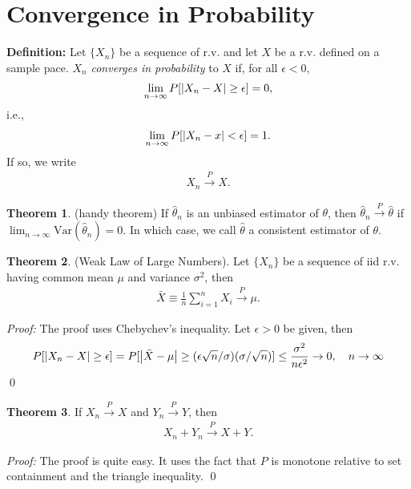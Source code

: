\documentclass{book}
\theoremstyle{definition}
\newtheorem{thm}{Theorem}[section]
\newcommand{\f}[2]{\frac{#1}{#2}}
\begin{document}
 




\section{Convergence in Probability}


\noindent \textbf{Definition:} Let $\{X_n\}$ be a sequence of r.v. and let $X$ be  a r.v. defined on a sample pace. $X_n$ \textit{converges in probability} to $X$ if, for all $\epsilon < 0$,
\begin{align}
\lim_{n\to \infty}P[\abs{X_n - X} \geq \epsilon] = 0,
\end{align}
i.e.,
\begin{align}
\lim_{n\to \infty}P[\abs{X_n - x} < \epsilon] = 1.
\end{align}
If so, we write
\begin{align}
X_n \xrightarrow{P} X.
\end{align}





\begin{thm} (handy theorem) If $\hat\theta_n$ is an unbiased estimator of $\theta$, then $\hat\theta_n \xrightarrow{P} \hat\theta$ if $\lim_{n\to \infty} \text{Var}{(\hat\theta_n)} = 0$. In which case, we call $\hat\theta$ a consistent estimator of $\theta$.\\
\end{thm}



\begin{thm} (Weak Law of Large Numbers). Let $\{ X_n\}$ be a sequence of iid r.v. having common mean $\mu$ and variance $\sigma^2$, then
\begin{align}
\bar{X} \equiv \f{1}{n}\sum^n_{i=1}X_i \xrightarrow{P} \mu.
\end{align}
\end{thm}

\noindent \textit{Proof:} The proof uses Chebychev's inequality. Let $\epsilon > 0$ be given, then
\begin{align}
P[\abs{X_n - X} \geq \epsilon] = P[\abs{\bar{X} - \mu} \geq (\epsilon\sqrt{n}/\sigma)(\sigma/\sqrt{n})] \leq \f{\sigma^2}{n\epsilon^2} \to 0, \quad n\to \infty
\end{align}
\qed



\begin{thm} If $X_n \xrightarrow{P} X$ and $Y_n \xrightarrow{P} Y$, then 
\begin{align}
X_n + Y_n \xrightarrow{P} X +Y.
\end{align}
\end{thm}
\noindent\textit{Proof:} The proof is quite easy. It uses the fact that $P$ is monotone relative to set containment and the triangle inequality. \qed
\end{document}

